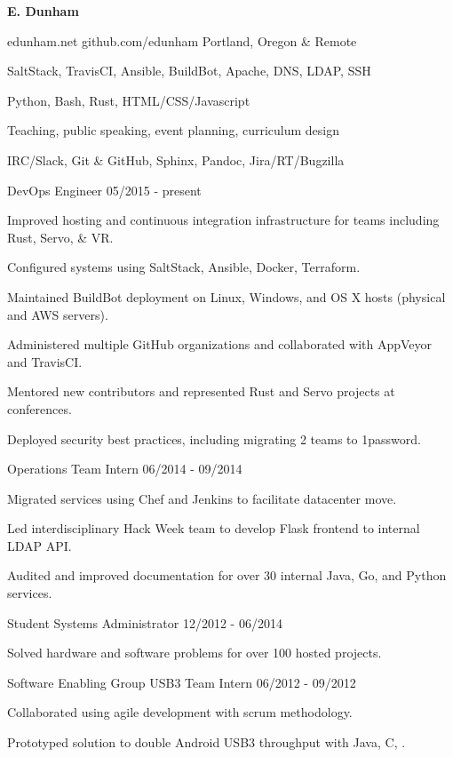\documentclass[11pt]{article} %
\begin{document}
\centerline{{\Huge \bf E. Dunham}}

\bigskip

        {edunham.net}
        {github.com/edunham}
        {Portland, Oregon \& Remote}


      {SaltStack, TravisCI, Ansible, BuildBot, Apache, DNS, LDAP, SSH}

      {Python, Bash, Rust, HTML/CSS/Javascript}

      {Teaching, public speaking, event planning, curriculum design}

      {IRC/Slack, Git \& GitHub, Sphinx, Pandoc, Jira/RT/Bugzilla}



\begin{description}
\squish
{}
           {DevOps Engineer}
           {05/2015 - present}

Improved hosting and continuous integration infrastructure for teams
including Rust, Servo, \& VR.

Configured systems using SaltStack, Ansible, Docker, Terraform.

Maintained BuildBot deployment on Linux, Windows, and OS X hosts (physical and
AWS servers).

Administered multiple GitHub organizations and collaborated with AppVeyor and
TravisCI.

Mentored new contributors and represented Rust and Servo projects at
conferences.

Deployed security best practices, including migrating 2 teams to 1password.

           {Operations Team Intern}
           {06/2014 - 09/2014}

Migrated services using Chef and Jenkins to facilitate datacenter move.

Led interdisciplinary Hack Week team to develop Flask frontend to internal
LDAP API.

Audited and improved documentation for over 30 internal Java, Go, and Python
services.

           {Student Systems Administrator}
           {12/2012 - 06/2014}

Solved hardware and software problems for over 100 hosted projects.

           {Software Enabling Group USB3 Team Intern}
           {06/2012 - 09/2012}

Collaborated using agile development with scrum methodology.

Prototyped solution to double Android USB3 throughput with Java, C, \CPP.

\end{description}
\end{document}
